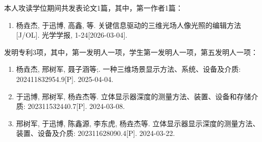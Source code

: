 \begin{publication}
\justifying

\newcommand{\IF}[1]{\textcolor{Maroon}{IF = #1}}

本人攻读学位期间共发表论文1篇，其中，第一作者1篇：

\begin{enumerate}
\item 杨垚杰, 于迅博, 高鑫, 等. 关键信息驱动的三维光场人像光照的编辑方法[J/OL]. 光学学报, 1-24[2026-03-04].
\end{enumerate}

发明专利3项，其中，第一发明人一项，学生第一发明人一项，第五发明人一项：

\begin{enumerate}
\item 杨垚杰, 邢树军, 聂子涵等;. 一种三维场景显示方法、系统、设备及介质: 202411832954.9[P]. 2025-04-04.
\item 于迅博, 邢树军, 杨垚杰等. 立体显示器深度的测量方法、装置、设备和存储介质: 202311532440.7[P]. 2024-03-08.
\item 	邢树军, 于迅博, 陈鑫源, 李东虎, 杨垚杰等. 立体显示器显示深度的测量方法、装置、设备及介质: 202311628090.4[P]. 2024-03-22.

\end{enumerate}

\end{publication}